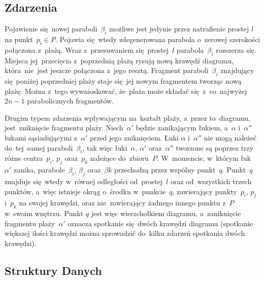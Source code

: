 \documentclass[skorowidz,autorrok,backref,xodstep,oswiadczenie]{wmimgr}
\begin{document}
\subsection{Zdarzenia}

Pojawienie się~nowej paraboli~$\beta_{i}$ możliwe jest jedynie przez natrafienie prostej $l$ na punkt~$p_{i} \in P$. Pojawia się~wtedy zdegenerowana parabola o~zerowej szerokości połączona z~plażą. Wraz z~przesuwaniem się~prostej~$l$ parabola~$\beta_{i}$ rozszerza się. Miejsca jej~przecięcia z~poprzednią plażą rysują nową krawędź diagramu, która~nie~jest jeszcze połączona z~jego resztą. Fragment paraboli~$\beta_{i}$ znajdujący się~poniżej poprzedniej plaży staje się~jej nowym fragmentem tworząc nową plażę. Można z~tego wywnioskować, że~plaża może składać się~z~co~najwyżej~$2n-1$ parabolicznych fragmentów.

Drugim typem zdarzenia wpływającym na~kształt plaży, a~przez to~diagramu, jest~zniknięcie fragmentu plaży. Niech~$\alpha'$ będzie zanikającym łukiem, a~$\alpha$ i~$\alpha''$ łukami sąsiadującymi z~$\alpha'$ przed jego zniknięciem. Łuki $\alpha$ i~$\alpha''$ nie mogą należeć do~tej~samej paraboli~$\beta_{i}$, tak więc łuki~$\alpha$, $\alpha'$ oraz~$\alpha''$ tworzone są poprzez trzy różne centra~$p_{i}$, $p_{j}$ oraz~$p_{k}$ należące do~zbioru~$P$. W~momencie, w~którym łuk~$\alpha'$ zanika, parabole~$\beta_{i}$, $\beta_{j}$ oraz~$\beta{k}$ przechodzą przez wspólny punkt~$q$. Punkt~$q$ znajduje się~wtedy w~równej odległości od~prostej~$l$ oraz od~wszystkich trzech punktów, a~więc istnieje okrąg o~środku w~punkcie~$q$, zawierający punkty~$p_{i}$, $p_{j}$ i~$p_{k}$ na swojej krawędzi, oraz nie~zawierający żadnego innego punktu z~$P$ w~swoim wnętrzu. Punkt $q$ jest więc wierzchołkiem diagramu, a~zaniknięcie fragmentu plaży~$\alpha'$ oznacza spotkanie się~dwóch krawędzi diagramu (spotkanie większej ilości krawędzi można sprowadzić do~kilku zdarzeń spotkania dwóch krawędzi).

\subsection{Struktury Danych}
\end{document}
